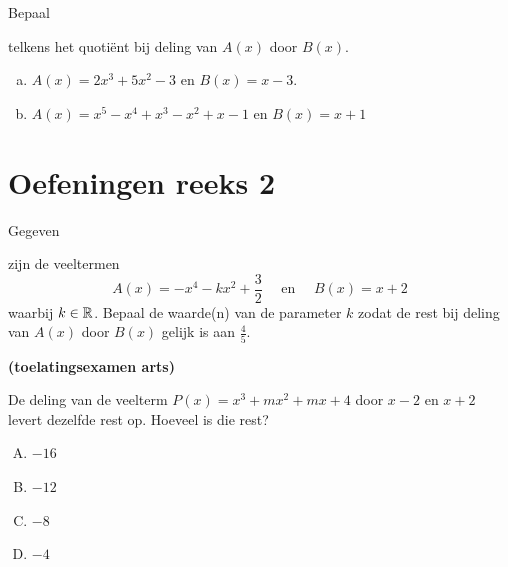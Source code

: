 \documentclass{ximera}
\begin{document}
\begin{Oefening}\setcounter{enumi}{4}
\hypertarget{oef3.4}{Bepaal} telkens het quoti\"ent bij deling van $A(x)$ door $B(x)$.%
\begin{enumerate}[(a)]
\item
$A(x) = 2x^3+5x^2-3$ \quad en \quad $B(x) = x-3$.
\item
$A(x) = x^5 - x^4 + x^3 - x^2 + x - 1$ \quad en \quad $B(x) = x+1$
\end{enumerate}
\end{Oefening}

\section*{Oefeningen reeks 2}

\begin{Oefening}\setcounter{enumi}{5}
\hypertarget{oef3.5}{Gegeven} zijn de veeltermen
\[
A(x) = -x^4 - kx^2+\frac{3}{2} \quad \text{ en } \quad B(x) = x+2
\]
waarbij $k \in \mathbb{R}$. Bepaal de waarde(n) van de parameter $k$ zodat de rest bij deling van $A(x)$ door $B(x)$ gelijk is aan $\frac{4}{5}$. 
\end{Oefening}

\begin{Oefening}\setcounter{enumi}{6} 
\hypertarget{oef3.6}{{\bf (toelatingsexamen arts)}} 
De deling van de veelterm $P(x) = x^3 + mx^2 + mx + 4$ door $x-2$ en $x+2$ levert dezelfde rest op. Hoeveel is die rest?
\begin{multicols}{4} 
\begin{enumerate}[(A)]
\item 
$-16$
\item 
$-12$ 
\item 
$-8$ 
\item
$-4$
\end{enumerate}
\end{multicols}
\end{Oefening}
\end{document}

